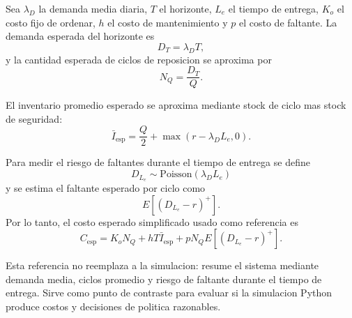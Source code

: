 Sea $\lambda_D$ la demanda media diaria, $T$ el horizonte, $L_e$ el tiempo de entrega, $K_o$ el costo fijo de ordenar, $h$ el costo de mantenimiento y $p$ el costo de faltante. La demanda esperada del horizonte es
\[
    D_T = \lambda_D T,
\]
y la cantidad esperada de ciclos de reposicion se aproxima por
\[
    N_Q = \frac{D_T}{Q}.
\]

El inventario promedio esperado se aproxima mediante stock de ciclo mas stock de seguridad:
\[
    \bar I_{\mathrm{esp}} =
    \frac{Q}{2} + \max(r-\lambda_D L_e,0).
\]

Para medir el riesgo de faltantes durante el tiempo de entrega se define
\[
    D_{L_e} \sim \mathrm{Poisson}(\lambda_D L_e)
\]
y se estima el faltante esperado por ciclo como
\[
    E[(D_{L_e}-r)^+].
\]
Por lo tanto, el costo esperado simplificado usado como referencia es
\[
    C_{\mathrm{esp}} =
    K_o N_Q + hT\bar I_{\mathrm{esp}}
    + pN_Q E[(D_{L_e}-r)^+].
\]

Esta referencia no reemplaza a la simulacion: resume el sistema mediante demanda media, ciclos promedio y riesgo de faltante durante el tiempo de entrega. Sirve como punto de contraste para evaluar si la simulacion Python produce costos y decisiones de politica razonables.
